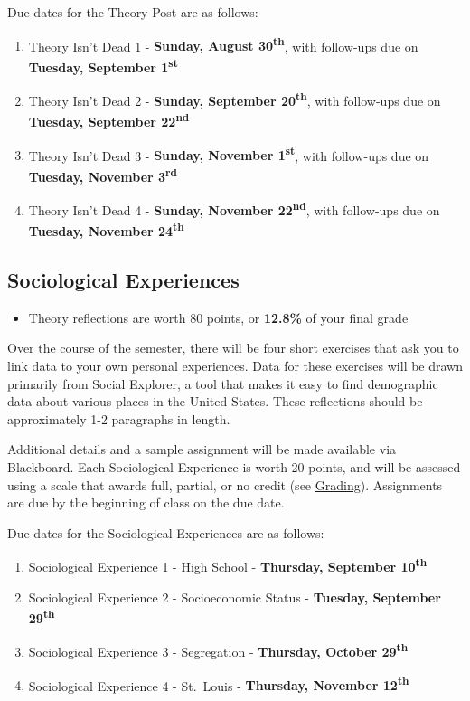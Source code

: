 \documentclass[
]{book}
\providecommand{\tightlist}{%
  \setlength{\itemsep}{0pt}\setlength{\parskip}{0pt}}
\newenvironment{rmdblock}[1]
  {\begin{shaded*}
  \begin{itemize}
  \renewcommand{\labelitemi}{
    \raisebox{-.7\height}[0pt][0pt]{
      {\setkeys{Gin}{width=3em,keepaspectratio}\texttt{[image: images/\#1]}}
    }
  }
  \item
  }
  {
  \end{itemize}
  \end{shaded*}
  }
\newenvironment{rmdtip}
  {\begin{rmdblock}{tip}}
  {\end{rmdblock}}
\begin{document}
Due dates for the Theory Post are as follows:

\begin{enumerate}
\def\labelenumi{\arabic{enumi}.}
\tightlist
\item
  Theory Isn't Dead 1 - \textbf{Sunday, August 30\textsuperscript{th}}, with follow-ups due on \textbf{Tuesday, September 1\textsuperscript{st}}
\item
  Theory Isn't Dead 2 - \textbf{Sunday, September 20\textsuperscript{th}}, with follow-ups due on \textbf{Tuesday, September 22\textsuperscript{nd}}
\item
  Theory Isn't Dead 3 - \textbf{Sunday, November 1\textsuperscript{st}}, with follow-ups due on \textbf{Tuesday, November 3\textsuperscript{rd}}
\item
  Theory Isn't Dead 4 - \textbf{Sunday, November 22\textsuperscript{nd}}, with follow-ups due on \textbf{Tuesday, November 24\textsuperscript{th}}
\end{enumerate}

\hypertarget{sociological-experiences}{%
\subsection{Sociological Experiences}\label{sociological-experiences}}

\begin{rmdtip}
Theory reflections are worth 80 points, or \textbf{12.8\%} of your final
grade
\end{rmdtip}

Over the course of the semester, there will be four short exercises that ask you to link data to your own personal experiences. Data for these exercises will be drawn primarily from Social Explorer, a tool that makes it easy to find demographic data about various places in the United States. These reflections should be approximately 1-2 paragraphs in length.

Additional details and a sample assignment will be made available via Blackboard. Each Sociological Experience is worth 20 points, and will be assessed using a scale that awards full, partial, or no credit (see \href{grading.html}{Grading}). Assignments are due by the beginning of class on the due date.

Due dates for the Sociological Experiences are as follows:

\begin{enumerate}
\def\labelenumi{\arabic{enumi}.}
\tightlist
\item
  Sociological Experience 1 - High School - \textbf{Thursday, September 10\textsuperscript{th}}
\item
  Sociological Experience 2 - Socioeconomic Status - \textbf{Tuesday, September 29\textsuperscript{th}}
\item
  Sociological Experience 3 - Segregation - \textbf{Thursday, October 29\textsuperscript{th}}
\item
  Sociological Experience 4 - St.~Louis - \textbf{Thursday, November 12\textsuperscript{th}}
\end{enumerate}
\end{document}
